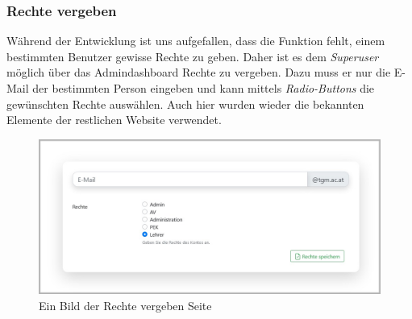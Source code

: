 \newpage 
\subsubsection{Rechte vergeben}
Während der Entwicklung ist uns aufgefallen, dass die Funktion fehlt, einem bestimmten Benutzer gewisse Rechte zu geben. Daher ist es dem \textit{Superuser} möglich über das Admindashboard Rechte zu vergeben. Dazu muss er nur die E-Mail der bestimmten Person eingeben und kann mittels \textit{Radio-Buttons} die gewünschten Rechte auswählen. Auch hier wurden wieder die bekannten Elemente der restlichen Website verwendet.
\begin{figure}[H]
	\centering
	\includegraphics[width=1\linewidth]{images/website/rechte}
	\caption[Neuer Schulantrag]{Ein Bild der Rechte vergeben Seite}
	\label{fig:rightssite}
\end{figure}
~\\


